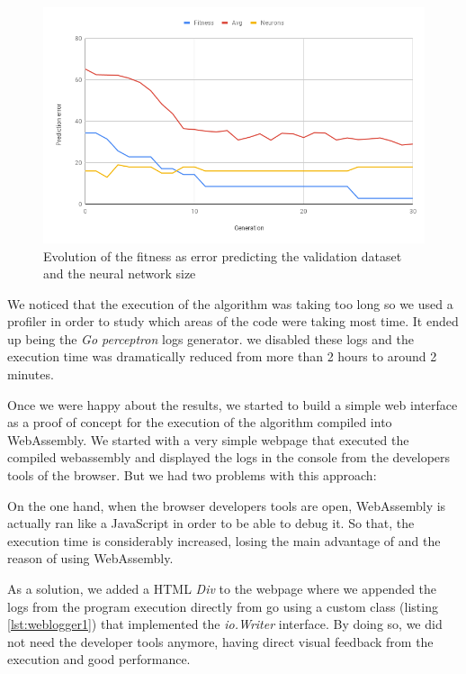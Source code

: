 \begin{figure}[h!]
		\centering
    	\includegraphics[width=\linewidth]{assets/images/milestone1-native-chart.png}
    	\caption{Evolution of the fitness as error predicting the validation dataset and the neural network size}
    	\label{fig:native}
\end{figure} 

We noticed that the execution of the algorithm was taking too long so we used a profiler in order to study which areas of the code were taking most time. It ended up being the \textit{Go perceptron} logs generator. we disabled these logs and the execution time was dramatically reduced from more than 2 hours to around 2 minutes.

Once we were happy about the results, we started to build a simple web interface as a proof of concept for the execution of the algorithm compiled into WebAssembly. We started with a very simple webpage that executed the compiled webassembly and displayed the logs in the console from the developers tools of the browser. But we had two problems with this approach:

On the one hand, when the browser developers tools are open, WebAssembly is actually ran like a JavaScript in order to be able to debug it. So that, the execution time is considerably increased, losing the main advantage of and the reason of using WebAssembly.

As a solution, we added a HTML \textit{Div} to the webpage where we appended the logs from the program execution directly from go using a custom class (listing \ref{lst:weblogger1}) that implemented the \textit{io.Writer} interface. By doing so, we did not need the developer tools anymore, having direct visual feedback from the execution and good performance.

